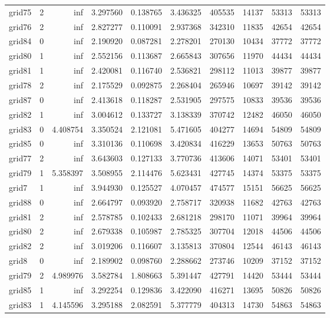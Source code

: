 \documentclass[../../../thesis.tex]{subfiles}
\begin{document}
\begin{longtable}{|l|r|r|r|r|r|r|r|r|r|}
grid75 & 2 & inf & 3.297560 & 0.138765 & 3.436325 & 405535 & 14137 & 53313 & 53313 \\
grid76 & 2 & inf & 2.827277 & 0.110091 & 2.937368 & 342310 & 11835 & 42654 & 42654 \\
grid84 & 0 & inf & 2.190920 & 0.087281 & 2.278201 & 270130 & 10434 & 37772 & 37772 \\
grid80 & 1 & inf & 2.552156 & 0.113687 & 2.665843 & 307656 & 11970 & 44434 & 44434 \\
grid81 & 1 & inf & 2.420081 & 0.116740 & 2.536821 & 298112 & 11013 & 39877 & 39877 \\
grid78 & 2 & inf & 2.175529 & 0.092875 & 2.268404 & 265946 & 10697 & 39142 & 39142 \\
grid87 & 0 & inf & 2.413618 & 0.118287 & 2.531905 & 297575 & 10833 & 39536 & 39536 \\
grid82 & 1 & inf & 3.004612 & 0.133727 & 3.138339 & 370742 & 12482 & 46050 & 46050 \\
grid83 & 0 & 4.408754 & 3.350524 & 2.121081 & 5.471605 & 404277 & 14694 & 54809 & 54809 \\
grid85 & 0 & inf & 3.310136 & 0.110698 & 3.420834 & 416229 & 13653 & 50763 & 50763 \\
grid77 & 2 & inf & 3.643603 & 0.127133 & 3.770736 & 413606 & 14071 & 53401 & 53401 \\
grid79 & 1 & 5.358397 & 3.508955 & 2.114476 & 5.623431 & 427745 & 14374 & 53375 & 53375 \\
grid7 & 1 & inf & 3.944930 & 0.125527 & 4.070457 & 474577 & 15151 & 56625 & 56625 \\
grid88 & 0 & inf & 2.664797 & 0.093920 & 2.758717 & 320938 & 11682 & 42763 & 42763 \\
grid81 & 2 & inf & 2.578785 & 0.102433 & 2.681218 & 298170 & 11071 & 39964 & 39964 \\
grid80 & 2 & inf & 2.679338 & 0.105987 & 2.785325 & 307704 & 12018 & 44506 & 44506 \\
grid82 & 2 & inf & 3.019206 & 0.116607 & 3.135813 & 370804 & 12544 & 46143 & 46143 \\
grid8 & 0 & inf & 2.189902 & 0.098760 & 2.288662 & 273746 & 10209 & 37152 & 37152 \\
grid79 & 2 & 4.989976 & 3.582784 & 1.808663 & 5.391447 & 427791 & 14420 & 53444 & 53444 \\
grid85 & 1 & inf & 3.292254 & 0.129836 & 3.422090 & 416271 & 13695 & 50826 & 50826 \\
grid83 & 1 & 4.145596 & 3.295188 & 2.082591 & 5.377779 & 404313 & 14730 & 54863 & 54863 \\

\end{longtable}
\end{document}
